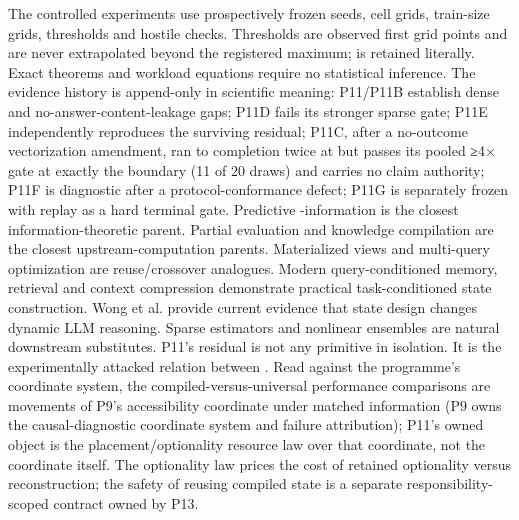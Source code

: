 \markdownRendererDocumentBegin
\markdownRendererSectionBegin
{}\markdownRendererInterblockSeparator
{}The controlled experiments use prospectively frozen seeds, cell grids, train-size grids, thresholds and hostile checks. Thresholds are observed first grid points and are never extrapolated beyond the registered maximum;  is retained literally. Exact theorems and workload equations require no statistical inference.\markdownRendererInterblockSeparator
{}The evidence history is append-only in scientific meaning: P11/P11B establish dense and no-answer-content-leakage gaps; P11D fails its stronger sparse gate; P11E independently reproduces the surviving residual; P11C, after a no-outcome vectorization amendment, ran to completion twice at  but passes its pooled ≥4× gate at exactly the boundary (11 of 20 draws) and carries no claim authority; P11F is diagnostic after a protocol-conformance defect; P11G is separately frozen with replay as a hard terminal gate.\markdownRendererInterblockSeparator
{}Predictive -information is the closest information-theoretic parent. Partial evaluation and knowledge compilation are the closest upstream-computation parents. Materialized views and multi-query optimization are reuse/crossover analogues. Modern query-conditioned memory, retrieval and context compression demonstrate practical task-conditioned state construction. Wong et al. provide current evidence that state design changes dynamic LLM reasoning. Sparse estimators and nonlinear ensembles are natural downstream substitutes.\markdownRendererInterblockSeparator
{}P11's residual is not any primitive in isolation. It is the experimentally attacked relation between . Read against the programme's coordinate system, the compiled-versus-universal performance comparisons are movements of P9's accessibility coordinate  under matched information  (P9 owns the causal-diagnostic coordinate system and failure attribution); P11's owned object is the placement/optionality resource law over that coordinate, not the coordinate itself. The optionality law prices the cost of retained optionality versus reconstruction; the safety of reusing compiled state is a separate responsibility-scoped contract owned by P13.
\markdownRendererSectionEnd \markdownRendererDocumentEnd